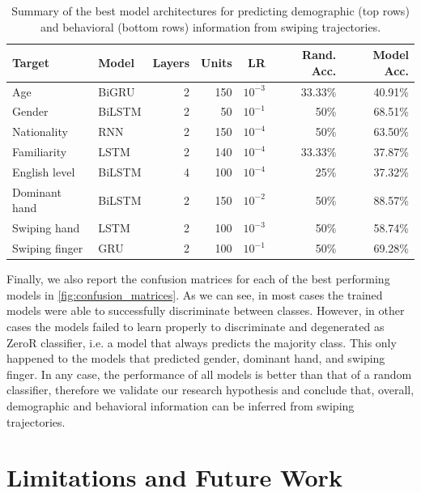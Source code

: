 \documentclass[sn-mathphys, pdflatex]{sn-jnl}
\newcommand{\rev}[1]{#1}
\begin{document}
\begin{table}[!ht]
\centering
\small
\setlength\tabcolsep{0.5em}
\begin{tabular}{ll *5r}
\toprule
\textbf{Target} & \textbf{Model} & \textbf{Layers} & \textbf{Units} & \textbf{LR} & \textbf{Rand. Acc.} & \textbf{Model Acc.} \\
\midrule
Age                 & BiGRU  & 2 & 150 & $10^{-3}$ & 33.33\% & 40.91\% \\
Gender              & BiLSTM & 2 & 50  & $10^{-1}$ & 50\%    & 68.51\% \\
Nationality         & RNN    & 2 & 150 & $10^{-4}$ & 50\%    & 63.50\% \\
\midrule
Familiarity         & LSTM   & 2 & 140 & $10^{-4}$ & 33.33\% & 37.87\% \\
English level       & BiLSTM & 4 & 100 & $10^{-4}$ & 25\%    & 37.32\% \\
Dominant hand       & BiLSTM & 2 & 150 & $10^{-2}$ & 50\%    & 88.57\% \\
Swiping hand        & LSTM   & 2 & 100 & $10^{-3}$ & 50\%    & 58.74\% \\
Swiping finger      & GRU    & 2 & 100 & $10^{-1}$ & 50\%    & 69.28\% \\
\bottomrule
\end{tabular}
\caption{Summary of the best model architectures for predicting demographic (top rows) and behavioral (bottom rows) information from swiping trajectories.}
\label{tab:Results}
\end{table}

\rev{
Finally, we also report the confusion matrices for each of the best performing models in \autoref{fig:confusion_matrices}.
As we can see, in most cases the trained models were able to successfully discriminate between classes.
However, in other cases the models failed to learn properly to discriminate and degenerated as ZeroR classifier,
i.e. a model that always predicts the majority class.
This only happened to the models that predicted gender, dominant hand, and swiping finger.
In any case, the performance of all models is better than that of a random classifier,
therefore we validate our research hypothesis and conclude that, overall,
demographic and behavioral information can be inferred from swiping trajectories.
}




\section{Limitations and Future Work}
\label{sec:limitations}
\end{document}
